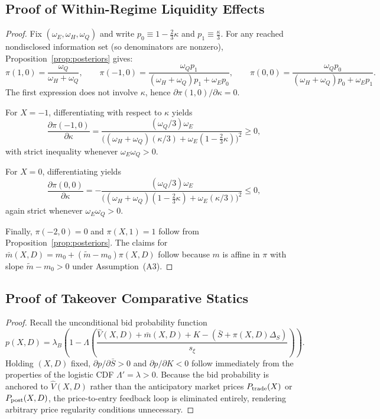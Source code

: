 \documentclass[11pt]{article}
\newcommand{\1}{\mathbf{1}}
\begin{document}
\subsection{Proof of Within-Regime Liquidity Effects}
\label{app:proof-cs-liquidity-within}

\begin{proof}
Fix $(\omega_E,\omega_H,\omega_Q)$ and write $p_0\equiv 1-\frac{2}{3}\kappa$ and $p_1\equiv \frac{\kappa}{3}$. For any reached nondisclosed information set (so denominators are nonzero), Proposition~\ref{prop:posteriors} gives:
\[
\pi(1,0)=\frac{\omega_Q}{\omega_H+\omega_Q},\qquad
\pi(-1,0)=\frac{\omega_Q p_1}{(\omega_H+\omega_Q)p_1+\omega_E p_0},\qquad
\pi(0,0)=\frac{\omega_Q p_0}{(\omega_H+\omega_Q)p_0+\omega_E p_1}.
\]
The first expression does not involve $\kappa$, hence $\partial \pi(1,0)/\partial\kappa=0$.

For $X=-1$, differentiating with respect to $\kappa$ yields
\[
\frac{\partial \pi(-1,0)}{\partial \kappa}
=\frac{(\omega_Q/3)\omega_E}{\big((\omega_H+\omega_Q)(\kappa/3)+\omega_E(1-\frac{2}{3}\kappa)\big)^2}\ge 0,
\]
with strict inequality whenever $\omega_E\omega_Q>0$.

For $X=0$, differentiating yields
\[
\frac{\partial \pi(0,0)}{\partial \kappa}
=-\frac{(\omega_Q/3)\omega_E}{\big((\omega_H+\omega_Q)(1-\frac{2}{3}\kappa)+\omega_E(\kappa/3)\big)^2}\le 0,
\]
again strict whenever $\omega_E\omega_Q>0$.

Finally, $\pi(-2,0)=0$ and $\pi(X,1)=1$ follow from Proposition~\ref{prop:posteriors}. The claims for $\bar{m}(X,D)=m_0+(\tilde m-m_0)\pi(X,D)$ follow because $m$ is affine in $\pi$ with slope $\tilde m-m_0>0$ under Assumption~\textup{(A3)}.
\end{proof}

\subsection{Proof of Takeover Comparative Statics}
\label{app:proof-cs-takeover}

\begin{proof}
Recall the unconditional bid probability function
\[
p(X,D)=\lambda_B\left(1-\Lambda\!\left(\frac{\hat{V}(X,D)+\bar{m}(X,D)+K - (\bar{S} + \pi(X,D)\Delta_S)}{s_\xi}\right)\right).
\]
Holding $(X,D)$ fixed, $\partial p/\partial \bar S>0$ and $\partial p/\partial K<0$ follow immediately from the properties of the logistic CDF $\Lambda'=\lambda>0$. Because the bid probability is anchored to $\hat{V}(X,D)$ rather than the anticipatory market prices $P_{\textup{trade}}(X)$ or $P_{\textup{post}}(X,D)$, the price-to-entry feedback loop is eliminated entirely, rendering arbitrary price regularity conditions unnecessary.
\end{proof}
\end{document}
